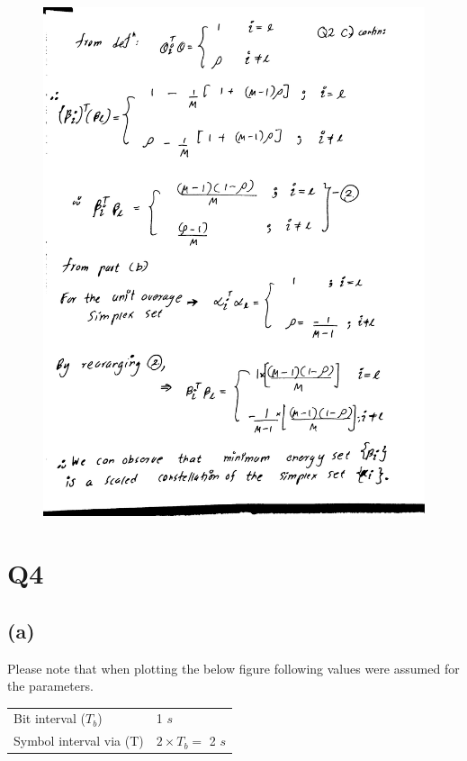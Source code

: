 \documentclass[a4paper,11pt]{article}%
\begin{document}
\begin{figure}[!h]
	\includegraphics[scale=0.22]{figures/img10}
\end{figure}

\section*{Q4}
\subsection*{(a)}

Please note that when plotting the below figure following values were assumed for the parameters.\\

\begin{tabular}{l l}
	Bit interval ($T_b$) & 1 $s$ \\
	Symbol interval via (T) &$2 \times T_b = $  2 $s$
\end{tabular}
\end{document}
